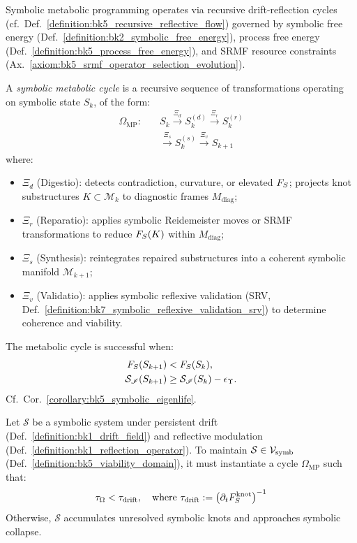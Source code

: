Symbolic metabolic programming operates via recursive drift-reflection cycles (cf.~Def.~\ref{definition:bk5_recursive_reflective_flow}) governed by symbolic free energy (Def.~\ref{definition:bk2_symbolic_free_energy}), process free energy (Def.~\ref{definition:bk5_process_free_energy}), and SRMF resource constraints (Ax.~\ref{axiom:bk5_srmf_operator_selection_evolution}).
\begin{definition}
\label{definition:bk8_recursive_symbolic_metaboloic_cycle}
A \emph{symbolic metabolic cycle} is a recursive sequence of transformations operating on symbolic state $S_k$, of the form:
\begin{align*}
\Omega_{\mathrm{MP}} :\quad
& S_k \xrightarrow{\Xi_d} S_k^{(d)} \xrightarrow{\Xi_r} S_k^{(r)} \\
& \xrightarrow{\Xi_s} S_k^{(s)} \xrightarrow{\Xi_v} S_{k+1}
\end{align*}
where:
\begin{itemize}
  \item $\Xi_d$ (Digestio): detects contradiction, curvature, or elevated $F_S$; projects knot substructures $K \subset \mathcal{M}_k$ to diagnostic frames $M_{\mathrm{diag}}$;
  \item $\Xi_r$ (Reparatio): applies symbolic Reidemeister moves or SRMF transformations to reduce $F_S(K)$ within $M_{\mathrm{diag}}$;
  \item $\Xi_s$ (Synthesis): reintegrates repaired substructures into a coherent symbolic manifold $\mathcal{M}_{k+1}$;
  \item $\Xi_v$ (Validatio): applies symbolic reflexive validation (SRV, Def.~\ref{definition:bk7_symbolic_reflexive_validation_srv}) to determine coherence and viability.
\end{itemize}
The metabolic cycle is successful when:
\[
\begin{aligned}
F_S(S_{k+1}) &< F_S(S_k), \\
\mathcal{S}_{\mathscr{I}}(S_{k+1}) &\ge \mathcal{S}_{\mathscr{I}}(S_k) - \epsilon_\Upsilon.
\end{aligned}
\]
Cf.~Cor.~\ref{corollary:bk5_symbolic_eigenlife}.
\end{definition}
\begin{theorem}
\label{theorem:bk8_thermodynamic_necessity_of_symbolic_metabolism}
Let $\mathcal{S}$ be a symbolic system under persistent drift
(Def.~\ref{definition:bk1_drift_field}) and reflective modulation
(Def.~\ref{definition:bk1_reflection_operator}).
To maintain $\mathcal{S} \in \mathcal{V}_{\mathrm{symb}}$
(Def.~\ref{definition:bk5_viability_domain}), it must instantiate a cycle
$\Omega_{\mathrm{MP}}$ such that:
\[
\tau_\Omega < \tau_{\mathrm{drift}}, \quad \text{where } \tau_{\mathrm{drift}} := \left( \partial_t F_S^{\text{knot}} \right)^{-1}
\]
Otherwise, $\mathcal{S}$ accumulates unresolved symbolic knots and approaches symbolic collapse.
\end{theorem}
